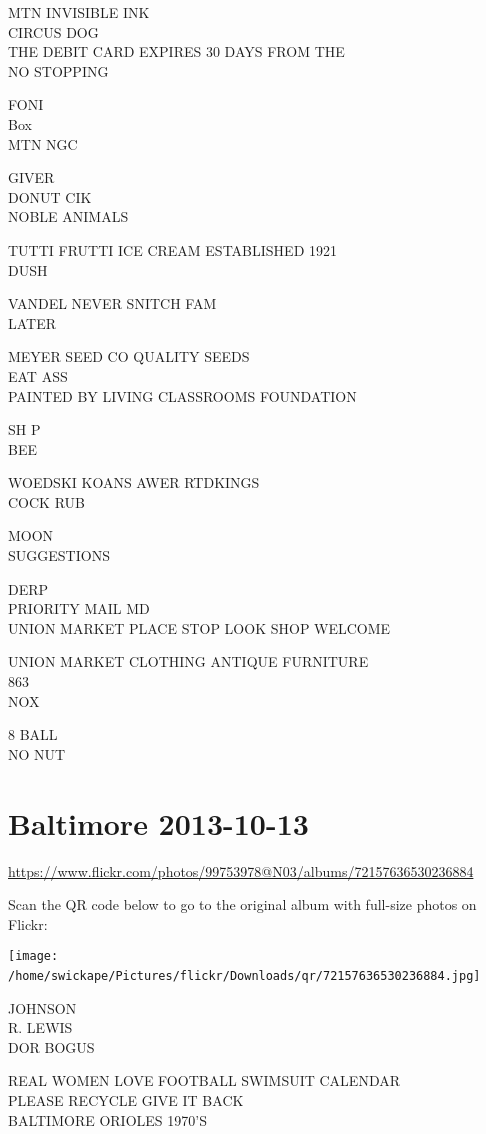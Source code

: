 \documentclass[10pt,letterpaper]{article}
\begin{document}
MTN INVISIBLE INK\\
CIRCUS DOG\\
THE DEBIT CARD EXPIRES 30 DAYS FROM THE\\
NO STOPPING

FONI\\
Box\\
MTN NGC

GIVER\\
DONUT CIK\\
NOBLE ANIMALS

TUTTI FRUTTI ICE CREAM ESTABLISHED 1921\\
DUSH

VANDEL NEVER SNITCH FAM\\
LATER

MEYER SEED CO QUALITY SEEDS\\
EAT ASS\\
PAINTED BY LIVING CLASSROOMS FOUNDATION

SH P\\
BEE

WOEDSKI KOANS AWER RTDKINGS\\
COCK RUB

MOON\\
SUGGESTIONS

DERP\\
PRIORITY MAIL MD\\
UNION MARKET PLACE STOP LOOK SHOP WELCOME

UNION MARKET CLOTHING ANTIQUE FURNITURE\\
863\\
NOX

8 BALL\\
NO NUT
\

\section*{Baltimore 2013-10-13}

\url{https://www.flickr.com/photos/99753978@N03/albums/72157636530236884}

Scan the QR code below to go to the original album with full-size photos on Flickr:

\texttt{[image: /home/swickape/Pictures/flickr/Downloads/qr/72157636530236884.jpg]}
\

JOHNSON\\
R. LEWIS\\
DOR BOGUS

REAL WOMEN LOVE FOOTBALL SWIMSUIT CALENDAR\\
PLEASE RECYCLE GIVE IT BACK\\
BALTIMORE ORIOLES 1970'S
\end{document}
